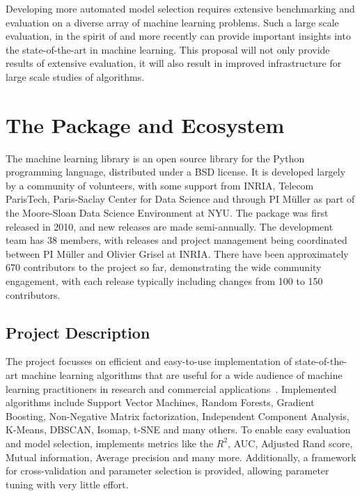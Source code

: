 Developing more automated model selection requires extensive benchmarking and evaluation
on a diverse array of machine learning problems. Such a large scale evaluation,
in the spirit of \textcite{caruana2008empirical, caruana2006empirical} and more
recently \textcite{feurer-nips2015} can provide important insights into the
state-of-the-art in machine learning. This proposal will not only provide
results of extensive evaluation, it will also result in improved infrastructure
for large scale studies of algorithms.

\section{The \sklearn{} Package and Ecosystem}
The \sklearn{} machine learning library is an open source library for the
Python programming language, distributed under a BSD license.
It is developed largely by a community of volunteers, with some support from
INRIA, Telecom ParisTech, Paris-Saclay Center for Data Science and through PI
M\"uller as part of the Moore-Sloan Data Science Environment at NYU\@.
The package was first released in 2010, and new releases are made semi-annually.
The development team has 38 members, with releases and project management being
coordinated between PI M\"uller and Olivier Grisel at INRIA\@.
There have been approximately 670 contributors to the project so far, demonstrating
the wide community engagement, with each release typically including changes
from 100 to 150 contributors.

\subsection{Project Description}
The \sklearn{} project focusses on efficient and easy-to-use implementation
of state-of-the-art machine learning algorithms that are useful for a wide
audience of machine learning practitioners in research and commercial
applications~\cite{pedregosa2011scikit, buitinck2013api}.
Implemented algorithms include Support Vector Machines, Random Forests, Gradient Boosting,
Non-Negative Matrix factorization, Independent Component Analysis, K-Means, DBSCAN, Isomap,
t-SNE and many others. To enable easy evaluation and model selection, \sklearn{}
implements metrics like the $R^2$, AUC, Adjusted Rand score, Mutual information, Average precision
and many more. Additionally, a framework for cross-validation and parameter selection is
provided, allowing parameter tuning with very little effort.

